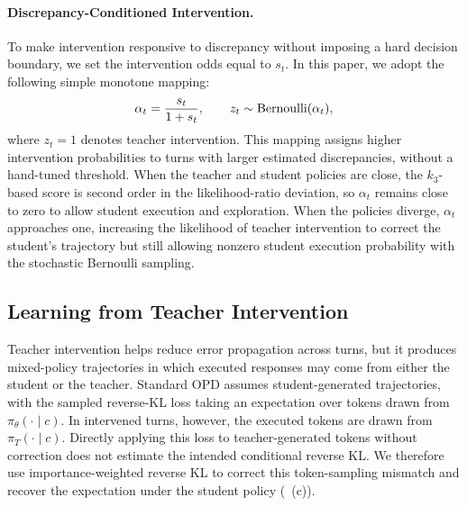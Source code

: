 \vspace{-0.5em}
\paragraph{Discrepancy-Conditioned Intervention.}
To make intervention responsive to discrepancy without imposing a hard decision boundary, we set the intervention odds equal to $s_t$. 
In this paper, we adopt the following simple monotone mapping:
\begin{equation}
    \setlength\abovedisplayskip{1.3pt}
    \setlength\belowdisplayskip{1.3pt}
    \alpha_t=\frac{s_t}{1+s_t},
    \qquad
    z_t\sim\operatorname{Bernoulli}(\alpha_t),
    \label{eq:intervention_probability}
\end{equation}
where $z_t=1$ denotes teacher intervention.
This mapping assigns higher intervention probabilities to turns with larger estimated discrepancies, without a hand-tuned threshold.
When the teacher and student policies are close, the $k_3$-based score is second order in the likelihood-ratio deviation, so $\alpha_t$ remains close to zero to allow student execution and exploration.
When the policies diverge, $\alpha_t$ approaches one, increasing the likelihood of teacher intervention to correct the student's trajectory but still allowing  nonzero student execution probability with the stochastic Bernoulli sampling.


\subsection{Learning from Teacher Intervention}
\label{sec:learning_from_teacher_intervention}

Teacher intervention helps reduce error propagation across turns, but it produces mixed-policy trajectories in which executed responses may come from either the student or the teacher.
Standard OPD assumes student-generated trajectories, with the sampled reverse-KL loss taking an expectation over tokens drawn from $\pi_\theta(\cdot\mid c)$.
In intervened turns, however, the executed tokens are drawn from $\pi_T(\cdot\mid c)$.
Directly applying this loss to teacher-generated tokens without correction does not estimate the intended conditional reverse KL.
We therefore use importance-weighted reverse KL to correct this token-sampling mismatch and recover the expectation under the student policy (~(c)).

\vspace{-0.5em}
